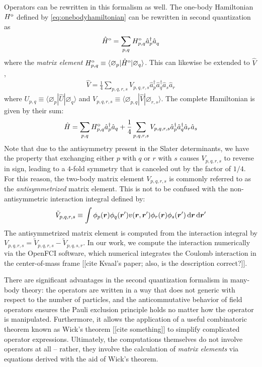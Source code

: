 Operators can be rewritten in this formalism as well.  The one-body
Hamiltonian $H^{\text o}$ defined by \eqref{eq:onebodyhamiltonian} can be
rewritten in second quantization as
\begin{align} \label{eq:second_quantized_one_body_hamiltonian}
  \hat H^{\text o} = \sum_{p, q} H_{p, q}^{\text o} \hat a_p^\dagger \hat a_q^{}
\end{align}
where the \textit{matrix element}
$H_{p, q}^{\text o} \equiv \langle \varnothing_p | \hat H^{\text o} | \varnothing_q \rangle$.  This
can likewise be extended to $\hat V$,
\begin{align} \label{eq:second_quantized_two_body_hamiltonian}
  \hat V = \frac{1}{4} \sum_{p, q, r, s} V_{p, q, r, s}^{}
  \hat a_p^\dagger \hat a_q^\dagger \hat a_s^{} \hat a_r^{}
\end{align}
where $U_{p, q} \equiv \langle \varnothing_p | \hat U | \varnothing_q \rangle$ and
$V_{p, q, r, s} \equiv \langle \varnothing_{p, q} | \hat V | \varnothing_{r, s} \rangle$.
The complete Hamiltonian is given by their sum:
\begin{align}
  \hat{H} = \sum_{p, q} H^{\text o}_{p, q} \hat{a}_p^\dagger \hat{a}_q + \frac{1}{4} \sum_{p, q, r, s} V_{p, q, r, s} \hat{a}_p^\dagger \hat{a}_q^\dagger \hat{a}_r \hat{a}_s  \label{eq:vacuumhamiltonian}
\end{align}
Note that due to the antisymmetry present in the Slater determinants, we have
the property that exchanging either $p$ with $q$ or $r$ with $s$ causes
$V_{p, q, r, s}$ to reverse in sign, leading to a $4$-fold symmetry that is
canceled out by the factor of $1/4$.  For this reason, the two-body matrix
element $V_{p, q, r, s}$ is commonly referred to as the \emph{antisymmetrized}
matrix element.  This is not to be confused with the non-antisymmetric
interaction integral defined by:
\begin{align*}
  \tilde V_{p, q, r, s} \equiv \int \phi_p(\bm r) \phi_q(\bm r') v(\bm r, \bm r') \phi_r(\bm r) \phi_s(\bm r') \operatorname{d\!} \bm r \operatorname{d\!} \bm r'
\end{align*}
The antisymmetrized matrix element is computed from the interaction integral
by $V_{p, q, r, s} = \tilde V_{p, q, r, s} - \tilde V_{p, q, s, r}$.  In our
work, we compute the interaction numerically via the OpenFCI software, which
numerical integrates the Coulomb interaction in the center-of-mass frame
[[cite Kvaal's paper; also, is the description correct?]].

There are significant advantages in the second quantization formalism in
many-body theory: the operators are written in a way that does not generic
with respect to the number of particles, and the anticommutative behavior of
field operators ensures the Pauli exclusion principle holds no matter how the
operator is manipulated.  Furthermore, it allows the application of a useful
combinatoric theorem known as Wick's theorem [[cite something]] to simplify
complicated operator expressions.  Ultimately, the computations themselves do
not involve operators at all -- rather, they involve the calculation of
\emph{matrix elements} via equations derived with the aid of Wick's theorem.

